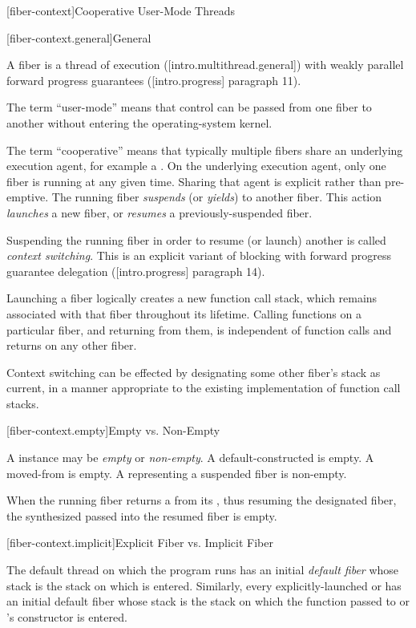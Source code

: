 \newpage

\setcounter{section}{33}
\setcounter{subsection}{10}

\label{api}

[fiber-context]{Cooperative User-Mode Threads}

[fiber-context.general]{General}

A fiber is a thread of execution ([intro.multithread.general]) with
weakly parallel forward progress guarantees ([intro.progress] paragraph 11).

The term ``user-mode'' means that control can be passed from one fiber to
another without entering the operating-system kernel.

The term ``cooperative'' means that typically multiple fibers share an
underlying execution agent, for example a . On the
underlying execution agent, only one fiber is running at any given time. Sharing
that agent is explicit rather than pre-emptive. The running
fiber \emph{suspends} (or \emph{yields}) to another fiber. This
action \emph{launches} a new fiber, or \emph{resumes} a previously-suspended
fiber.

Suspending the running fiber in order to resume (or launch) another is
called \emph{context switching}. This is an explicit variant of blocking with
forward progress guarantee delegation ([intro.progress] paragraph 14).

Launching a fiber logically creates a new function call stack, which remains
associated with that fiber throughout its lifetime. Calling functions on a
particular fiber, and returning from them, is independent of function calls
and returns on any other fiber.

Context switching can be effected by designating some other fiber's stack as
current, in a manner appropriate to the existing implementation of function call stacks.

[fiber-context.empty]{Empty vs. Non-Empty}

A \fiber instance may be \emph{empty} or \emph{non-empty}. A
default-constructed \fiber is empty. A moved-from \fiber is empty. A \fiber
representing a suspended fiber is non-empty.

When the running fiber returns a \fiber from its \entryfn, thus resuming the
designated fiber, the synthesized \fiber passed into the resumed fiber is
empty.

[fiber-context.implicit]{Explicit Fiber vs. Implicit Fiber}

The default thread on which the program runs \main has an
initial \emph{default fiber} whose stack is the stack on which \main is
entered.  Similarly, every explicitly-launched
 or  has an initial default fiber whose
stack is the stack on which the function passed to  or
's constructor is entered.

